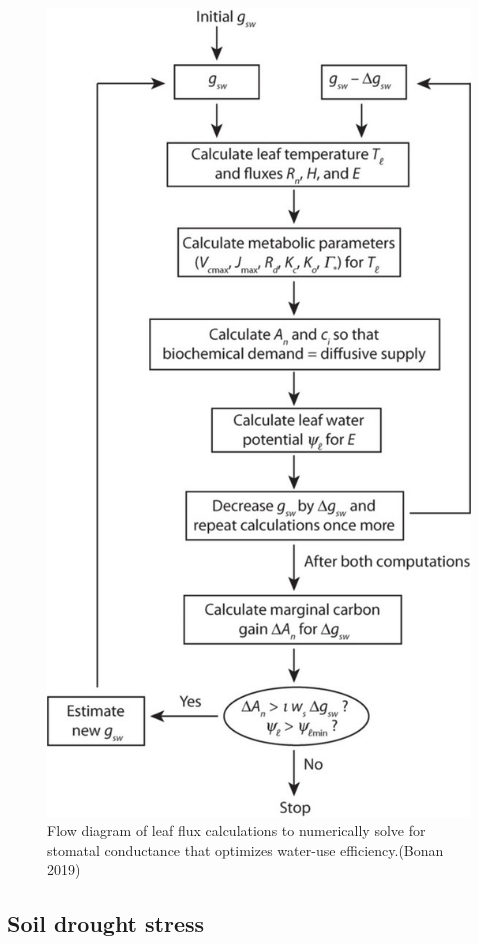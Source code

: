 \documentclass[
  12pt,
  oneside]{book}
\begin{document}
\begin{figure}

{\centering \includegraphics[width=0.8\linewidth]{figures/chap2/optimality} 

}

\caption{Flow diagram of leaf flux calculations to numerically solve for stomatal conductance that optimizes water-use efficiency.(Bonan 2019)}\label{fig:f215}
\end{figure}

\hypertarget{soil-drought-stress}{%
\subsection{Soil drought stress}\label{soil-drought-stress}}
\end{document}
